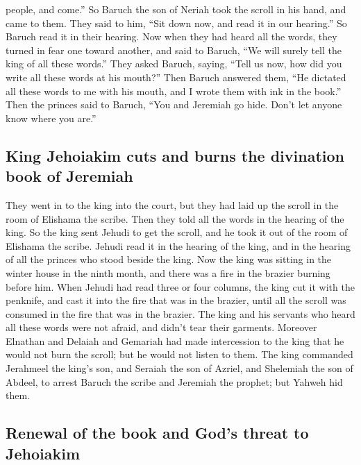 people, and come.'' So Baruch the son of Neriah took the scroll in his
hand, and came to them.  They said to him, ``Sit down
now, and read it in our hearing.'' So Baruch read it in their hearing.
 Now when they had heard all the words, they turned in
fear one toward another, and said to Baruch, ``We will surely tell the
king of all these words.''  They asked Baruch, saying,
``Tell us now, how did you write all these words at his mouth?''
 Then Baruch answered them, ``He dictated all these words
to me with his mouth, and I wrote them with ink in the book.''
 Then the princes said to Baruch, ``You and Jeremiah go
hide. Don't let anyone know where you are.''

\hypertarget{king-jehoiakim-cuts-and-burns-the-divination-book-of-jeremiah}{%
\subsection{King Jehoiakim cuts and burns the divination book of
Jeremiah}\label{king-jehoiakim-cuts-and-burns-the-divination-book-of-jeremiah}}

 They went in to the king into the court, but they had
laid up the scroll in the room of Elishama the scribe. Then they told
all the words in the hearing of the king.  So the king
sent Jehudi to get the scroll, and he took it out of the room of
Elishama the scribe. Jehudi read it in the hearing of the king, and in
the hearing of all the princes who stood beside the king.
 Now the king was sitting in the winter house in the
ninth month, and there was a fire in the brazier burning before him.
 When Jehudi had read three or four columns, the king cut
it with the penknife, and cast it into the fire that was in the brazier,
until all the scroll was consumed in the fire that was in the brazier.
 The king and his servants who heard all these words were
not afraid, and didn't tear their garments.  Moreover
Elnathan and Delaiah and Gemariah had made intercession to the king that
he would not burn the scroll; but he would not listen to them.
 The king commanded Jerahmeel the king's son, and Seraiah
the son of Azriel, and Shelemiah the son of Abdeel, to arrest Baruch the
scribe and Jeremiah the prophet; but Yahweh hid them.

\hypertarget{renewal-of-the-book-and-gods-threat-to-jehoiakim}{%
\subsection{Renewal of the book and God's threat to
Jehoiakim}\label{renewal-of-the-book-and-gods-threat-to-jehoiakim}}

